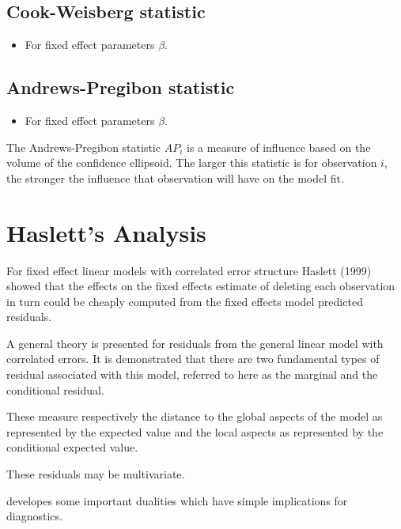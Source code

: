 \documentclass[12pt, a4paper]{report}
\theoremstyle{plain}
\theoremstyle{definition}
\theoremstyle{remark}
\begin{document}
\subsection{Cook-Weisberg statistic} %
\begin{itemize}
\item For fixed effect parameters $\beta$.
\end{itemize}


\subsection{Andrews-Pregibon statistic} %
\begin{itemize}
\item For fixed effect parameters $\beta$.
\end{itemize}
The Andrews-Pregibon statistic $AP_{i}$ is a measure of influence based on the volume of the confidence ellipsoid.
The larger this statistic is for observation $i$, the stronger the influence that observation will have on the model fit.




\newpage
\section{Haslett's Analysis} %
For fixed effect linear models with correlated error structure Haslett (1999) showed that the effects on
the fixed effects estimate of deleting each observation in turn could be cheaply computed from the fixed effects model predicted residuals.


A general theory is presented for residuals from the general linear model with correlated errors.
It is demonstrated that there are two fundamental types of residual associated with this model,
referred to here as the marginal and the conditional residual.


These measure respectively the distance to the global aspects of the model as represented by the expected value
and the local aspects as represented by the conditional expected value.


These residuals may be multivariate.


\citet{HaslettHayes} developes some important dualities which have simple implications for diagnostics.


\end{document}

